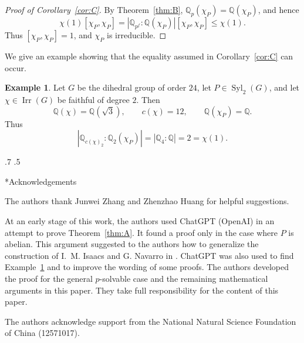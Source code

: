 \documentclass[reqno]{amsart}
\makeatletter
\theoremstyle{definition}
\newtheorem{exa}[thm]{Example}
\theoremstyle{remark}
\numberwithin{equation}{section}
\DeclareMathOperator{\Irr}{Irr}
\DeclareMathOperator{\Syl}{Syl}
\theoremstyle{plain}
\renewcommand{\section}{%
  \@startsection{section}{1}{\z@}%
    {.7\linespacing\@plus\linespacing}%
    {.5\linespacing}%
    {\normalfont\bfseries\raggedright
     \let\@secnumfont\bfseries}%
}
\makeatother
\begin{document}
\begin{proof}[Proof of Corollary~\ref{cor:C}]
By Theorem~\ref{thm:B},
$\mathbb{Q}_p(\chi_P)=\mathbb{Q}(\chi_P)$, and hence
\[
  \chi(1)[\chi_P,\chi_P]
  =|\mathbb{Q}_{p^f}:\mathbb{Q}(\chi_P)|[\chi_P,\chi_P]
  \leq\chi(1).
\]
Thus $[\chi_P,\chi_P]=1$, and $\chi_P$ is irreducible.
\end{proof}
We give an example showing that the equality assumed in
Corollary~\ref{cor:C} can occur.

\begin{exa}\label{ex:corollary-C}
Let $G$ be the dihedral group of order $24$, let
$P\in\Syl_2(G)$, and let $\chi\in\Irr(G)$ be faithful
of degree $2$. Then
\[
  \mathbb{Q}(\chi)=\mathbb{Q}(\sqrt{3}),\qquad
  c(\chi)=12,\qquad
  \mathbb{Q}(\chi_P)=\mathbb{Q}.
\]
Thus
\[
  |\mathbb{Q}_{c(\chi)_2}:\mathbb{Q}_2(\chi_P)|
  =|\mathbb{Q}_4:\mathbb{Q}|
  =2=\chi(1).
\]
\end{exa}



\section*{Acknowledgements}

The authors thank Junwei Zhang and Zhenzhao Huang for
helpful suggestions.



At an early stage of this work, the authors used ChatGPT
(OpenAI) in an attempt to prove Theorem~\ref{thm:A}.
It found a proof only in the case where $P$ is abelian.
This argument suggested to the authors how to generalize
the construction of I.~M. Isaacs and G. Navarro in \cite{IN}.
ChatGPT was also used to find Example~\ref{ex:corollary-C}
and to improve the wording of some proofs.
The authors developed the proof for the general
$p$-solvable case and the remaining mathematical arguments
in this paper. They take full responsibility for the
content of this paper.

The authors acknowledge support from the National Natural Science Foundation of China (12571017).
\end{document}
